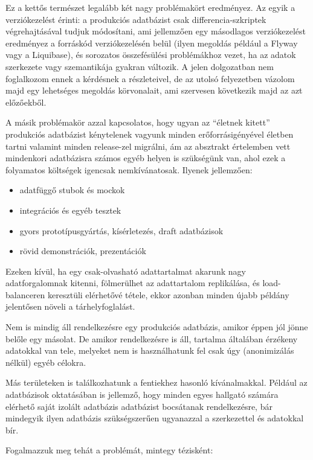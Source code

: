 \documentclass[
    parspace,
    noindent,
    nohyp,
]{elteiktdk}[2023/04/10]
\begin{document}
Ez a kettős természet legalább két nagy problémakört eredményez.
Az egyik a verziókezelést érinti:
a produkciós adatbázist csak differencia-szkriptek végrehajtásával tudjuk módosítani,
ami jellemzően egy másodlagos verziókezelést eredményez a forráskód verziókezelésén belül
(ilyen megoldás például a Flyway vagy a Liquibase),
és sorozatos összefésülési problémákhoz vezet, ha az adatok szerkezete vagy szemantikája gyakran változik.
A jelen dolgozatban nem foglalkozom ennek a kérdésnek a részleteivel,
de az utolsó felyezetben vázolom majd egy lehetséges megoldás körvonalait,
ami szervesen következik majd az azt előzőekből.

A másik problémakör azzal kapcsolatos, hogy ugyan az ``életnek kitett'' produkciós adatbázist
kénytelenek vagyunk minden erőforrásigényével életben tartni valamint minden release-zel migrálni,
ám az absztrakt értelemben vett mindenkori adatbázisra számos egyéb helyen is szükségünk van,
ahol ezek a folyamatos költségek igencsak nemkívánatosak.
Ilyenek jellemzően:

\begin{itemize}
    \item adatfüggő stubok és mockok
    \item integrációs és egyéb tesztek
    \item gyors prototípusgyártás, kísérletezés, draft adatbázisok
    \item rövid demonstrációk, prezentációk
\end{itemize}

Ezeken kívül, ha egy csak-olvasható adattartalmat akarunk nagy adatforgalomnak kitenni,
fölmerülhet az adattartalom replikálása, és load-balanceren keresztüli elérhetővé tétele,
ekkor azonban minden újabb példány jelentősen növeli a tárhelyfoglalást.

Nem is mindig áll rendelkezésre egy produkciós adatbázis,
amikor éppen jól jönne belőle egy másolat.
De amikor rendelkezésre is áll, tartalma általában érzékeny adatokkal van tele,
melyeket nem is használhatunk fel csak úgy (anonimizálás nélkül) egyéb célokra.

Más területeken is találkozhatunk a fentiekhez hasonló kívánalmakkal.
Például az adatbázisok oktatásában is jellemző, hogy minden egyes hallgató
számára elérhető saját izolált adatbázis adatbázist bocsátanak rendelkezésre,
bár mindegyik ilyen adatbázis szükségszerűen ugyanazzal a szerkezettel és adatokkal bír.

Fogalmazzuk meg tehát a problémát, mintegy tézisként:
\end{document}
